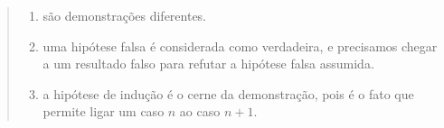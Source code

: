 \documentclass[12pt,a4paper]{article}
\newenvironment{ans}{\color{blue}\begin{quote}}{\end{quote}}
\begin{document}
\begin{enumerate}
	\begin{ans}
	\begin{enumerate}
	\item são demonstrações diferentes.
	\item uma hipótese falsa é considerada como verdadeira, e precisamos chegar a um resultado falso para refutar a hipótese falsa assumida.
	\item a hipótese de indução é o cerne da demonstração, pois é o fato que permite ligar um caso $n$ ao caso $n+1$.
	\end{enumerate}
	
	\end{ans}
	
	
\end{enumerate}
\end{document}
